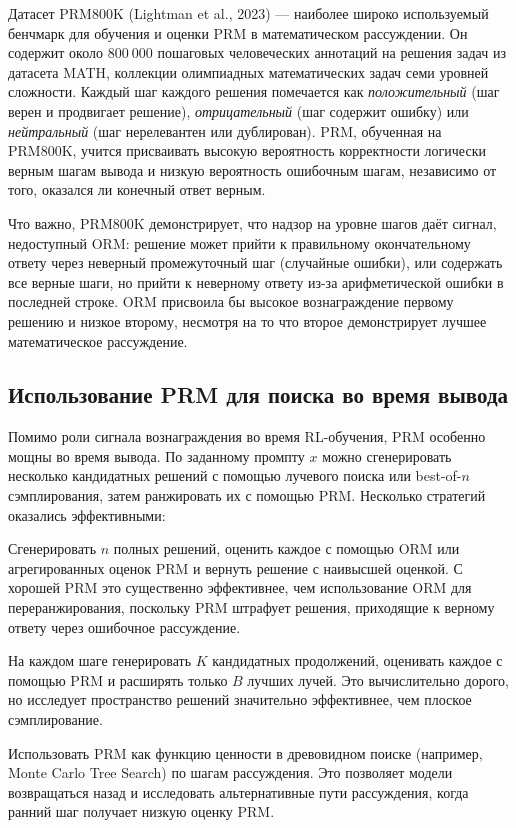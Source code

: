 \begin{example}
\label{ex:prm800k}
Датасет PRM800K (Lightman et al., 2023) --- наиболее широко используемый бенчмарк для обучения и оценки PRM в математическом рассуждении. Он содержит около $800~000$ пошаговых человеческих аннотаций на решения задач из датасета MATH, коллекции олимпиадных математических задач семи уровней сложности. Каждый шаг каждого решения помечается как \emph{положительный} (шаг верен и продвигает решение), \emph{отрицательный} (шаг содержит ошибку) или \emph{нейтральный} (шаг нерелевантен или дублирован). PRM, обученная на PRM800K, учится присваивать высокую вероятность корректности логически верным шагам вывода и низкую вероятность ошибочным шагам, независимо от того, оказался ли конечный ответ верным.

Что важно, PRM800K демонстрирует, что надзор на уровне шагов даёт сигнал, недоступный ORM: решение может прийти к правильному окончательному ответу через неверный промежуточный шаг (случайные ошибки), или содержать все верные шаги, но прийти к неверному ответу из-за арифметической ошибки в последней строке. ORM присвоила бы высокое вознаграждение первому решению и низкое второму, несмотря на то что второе демонстрирует лучшее математическое рассуждение.
\end{example}

\subsection{Использование PRM для поиска во время вывода}

Помимо роли сигнала вознаграждения во время RL-обучения, PRM особенно мощны во время вывода. По заданному промпту $x$ можно сгенерировать несколько кандидатных решений с помощью лучевого поиска или best-of-$n$ сэмплирования, затем ранжировать их с помощью PRM. Несколько стратегий оказались эффективными:

\begin{description}[leftmargin=!,labelwidth=3.5cm]
  \item[Переранжирование best-of-$n$] Сгенерировать $n$ полных решений, оценить каждое с помощью ORM или агрегированных оценок PRM и вернуть решение с наивысшей оценкой. С хорошей PRM это существенно эффективнее, чем использование ORM для переранжирования, поскольку PRM штрафует решения, приходящие к верному ответу через ошибочное рассуждение.
  \item[Пошаговый лучевой поиск] На каждом шаге генерировать $K$ кандидатных продолжений, оценивать каждое с помощью PRM и расширять только $B$ лучших лучей. Это вычислительно дорого, но исследует пространство решений значительно эффективнее, чем плоское сэмплирование.
  \item[Древовидный поиск под руководством PRM] Использовать PRM как функцию ценности в древовидном поиске (например, Monte Carlo Tree Search) по шагам рассуждения. Это позволяет модели возвращаться назад и исследовать альтернативные пути рассуждения, когда ранний шаг получает низкую оценку PRM.
\end{description}


